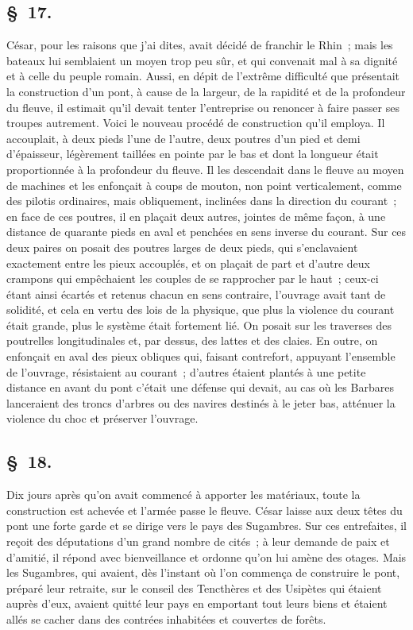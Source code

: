 \documentclass[french,twoside]{book} %
\begin{document}
\subsection[{§ 17.}]{ \textsc{§ 17.} }
\noindent César, pour les raisons que j’ai dites, avait décidé de franchir le Rhin ; mais les bateaux lui semblaient un moyen trop peu sûr, et qui convenait mal à sa dignité et à celle du peuple romain. Aussi, en dépit de l’extrême difficulté que présentait la construction d’un pont, à cause de la largeur, de la rapidité et de la profondeur du fleuve, il estimait qu’il devait tenter l’entreprise ou renoncer à faire passer ses troupes autrement. Voici le nouveau procédé de construction qu’il employa. Il accouplait, à deux pieds l’une de l’autre, deux poutres d’un pied et demi d’épaisseur, légèrement taillées en pointe par le bas et dont la longueur était proportionnée à la profondeur du fleuve. Il les descendait dans le fleuve au moyen de machines et les enfonçait à coups de mouton, non point verticalement, comme des pilotis ordinaires, mais obliquement, inclinées dans la direction du courant ; en face de ces poutres, il en plaçait deux autres, jointes de même façon, à une distance de quarante pieds en aval et penchées en sens inverse du courant. Sur ces deux paires on posait des poutres larges de deux pieds, qui s’enclavaient exactement entre les pieux accouplés, et on plaçait de part et d’autre deux crampons qui empêchaient les couples de se rapprocher par le haut ; ceux-ci étant ainsi écartés et retenus chacun en sens contraire, l’ouvrage avait tant de solidité, et cela en vertu des lois de la physique, que plus la violence du courant était grande, plus le système était fortement lié. On posait sur les traverses des poutrelles longitudinales et, par dessus, des lattes et des claies. En outre, on enfonçait en aval des pieux obliques qui, faisant contrefort, appuyant l’ensemble de l’ouvrage, résistaient au courant ; d’autres étaient plantés à une petite distance en avant du pont c’était une défense qui devait, au cas où les Barbares lanceraient des troncs d’arbres ou des navires destinés à le jeter bas, atténuer la violence du choc et préserver l’ouvrage.
\subsection[{§ 18.}]{ \textsc{§ 18.} }
\noindent Dix jours après qu’on avait commencé à apporter les matériaux, toute la construction est achevée et l’armée passe le fleuve. César laisse aux deux têtes du pont une forte garde et se dirige vers le pays des Sugambres. Sur ces entrefaites, il reçoit des députations d’un grand nombre de cités ; à leur demande de paix et d’amitié, il répond avec bienveillance et ordonne qu’on lui amène des otages. Mais les Sugambres, qui avaient, dès l’instant où l’on commença de construire le pont, préparé leur retraite, sur le conseil des Tencthères et des Usipètes qui étaient auprès d’eux, avaient quitté leur pays en emportant tout leurs biens et étaient allés se cacher dans des contrées inhabitées et couvertes de forêts.
\end{document}
